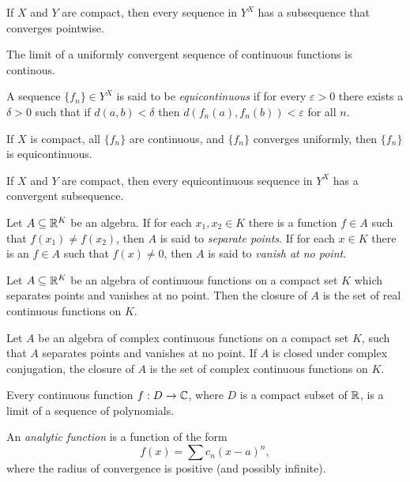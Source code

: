 \begin{prop}
    If $X$ and $Y$ are compact, then every sequence in $Y^X$ has a subsequence
    that converges pointwise.
\end{prop}
\begin{cor}
    The limit of a uniformly convergent sequence of continuous functions is
    continous.
\end{cor}
\begin{defn}
    A sequence $\{f_n\}\in Y^X$ is said to be \emph{equicontinuous} if for
    every $\varepsilon>0$ there exists a $\delta>0$ such that if $d(a,b)<\delta$
    then $d(f_n(a),f_n(b))<\varepsilon$ for all $n$.
\end{defn}
\begin{prop}
    If $X$ is compact, all $\{f_n\}$ are continuous, and
    $\{f_n\}$ converges uniformly, then $\{f_n\}$ is
    equicontinuous.
\end{prop}
\begin{prop}
    If $X$ and $Y$ are compact, then every equicontinuous sequence in
    $Y^X$ has a convergent subsequence.
\end{prop}
\begin{defn}
    Let $A\subseteq \mathbb{R}^K$ be an algebra. If for
    each $x_1,x_2\in K$ there is a function $f\in A$ such that $f(x_1)\ne
    f(x_2)$, then $A$ is said to \emph{separate points}. If for each $x\in
    K$ there is an $f\in A$ such that $f(x)\ne 0$, then $A$ is said to
    \emph{vanish at no point}.
\end{defn}
\begin{thm}
    Let $A\subseteq \mathbb{R}^K$ be an algebra of continuous functions on a
    compact set $K$ which separates points and vanishes at no point. Then the
    closure of $A$ is the set of real continuous functions on $K$.
\end{thm}
\begin{cor}
    Let $A$ be an algebra of complex continuous functions
    on a compact set $K$, such that $A$ separates points and vanishes at no
    point. If $A$ is closed under complex conjugation, the closure of $A$ is the
    set of complex continuous functions on $K$.
\end{cor}
\begin{cor}[Weierstrass]
    Every continuous function $f:D\to\mathbb{C}$, where $D$ is a compact subset of
    $\mathbb{R}$, is a limit of a sequence of polynomials.
\end{cor}
\begin{defn}
    An \emph{analytic function} is a function of the form \[f(x)=\sum c_n
    (x-a)^n,\] where the radius of convergence is positive (and possibly
    infinite).
\end{defn}
